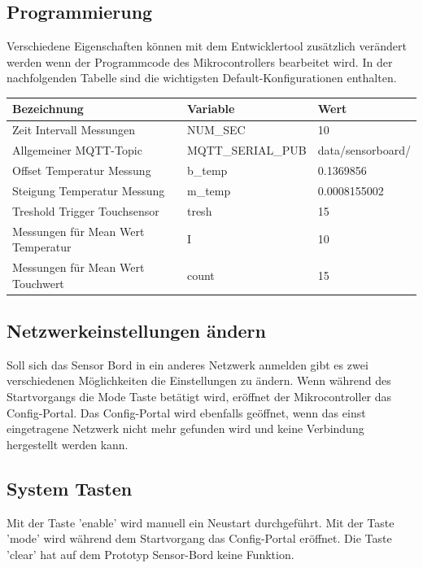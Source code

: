 \subsection{Programmierung}
Verschiedene Eigenschaften können mit dem Entwicklertool zusätzlich verändert werden wenn der Programmcode des Mikrocontrollers bearbeitet wird. In der nachfolgenden Tabelle sind die wichtigsten Default-Konfigurationen enthalten.
\begin{table}[H]
	\centering
	\begin{tabular}{|l|l|l|}
		\hline 
		Bezeichnung & Variable & Wert \\ 
		\hline 
		Zeit Intervall Messungen & NUM\_SEC & 10 \\ 
		\hline 
		Allgemeiner MQTT-Topic  & MQTT\_SERIAL\_PUB& data/sensorboard/ \\ 
		\hline 
		Offset Temperatur Messung & b\_temp & 0.1369856 \\ 
		\hline  
		Steigung Temperatur Messung & m\_temp & 0.0008155002 \\ 
		\hline  
		Treshold Trigger Touchsensor & tresh& 15 \\ 
		\hline
		Messungen für Mean Wert Temperatur & I & 10 \\ 
		\hline  
		Messungen für Mean Wert Touchwert & count & 15 \\ 
		\hline  
	\end{tabular} 	
\end{table}
\subsection{Netzwerkeinstellungen ändern}
Soll sich das Sensor Bord in ein anderes Netzwerk anmelden gibt es zwei verschiedenen Möglichkeiten die Einstellungen zu ändern. Wenn während des Startvorgangs die Mode Taste betätigt wird, eröffnet der Mikrocontroller das Config-Portal. Das Config-Portal wird ebenfalls geöffnet, wenn das einst eingetragene Netzwerk nicht mehr gefunden wird und keine Verbindung hergestellt werden kann.
\subsection{System Tasten}
Mit der Taste 'enable' wird manuell ein Neustart durchgeführt. Mit der Taste 'mode' wird während dem Startvorgang das Config-Portal eröffnet. Die Taste 'clear' hat auf dem Prototyp Sensor-Bord keine Funktion.

